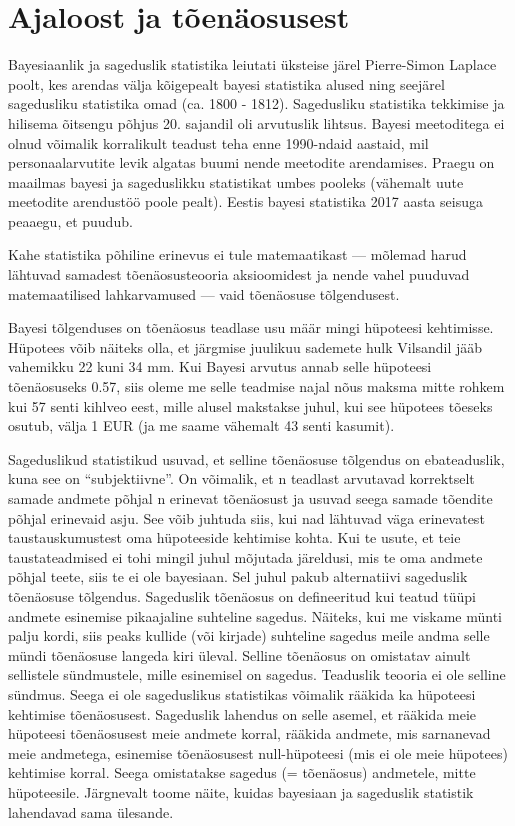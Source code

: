 \documentclass[]{book}
\begin{document}
\section{Ajaloost ja tõenäosusest}\label{ajaloost-ja-toenaosusest}

Bayesiaanlik ja sageduslik statistika leiutati üksteise järel
Pierre-Simon Laplace poolt, kes arendas välja kõigepealt bayesi
statistika alused ning seejärel sagedusliku statistika omad (ca. 1800 -
1812). Sagedusliku statistika tekkimise ja hilisema õitsengu põhjus 20.
sajandil oli arvutuslik lihtsus. Bayesi meetoditega ei olnud võimalik
korralikult teadust teha enne 1990-ndaid aastaid, mil personaalarvutite
levik algatas buumi nende meetodite arendamises. Praegu on maailmas
bayesi ja sageduslikku statistikat umbes pooleks (vähemalt uute
meetodite arendustöö poole pealt). Eestis bayesi statistika 2017 aasta
seisuga peaaegu, et puudub.

Kahe statistika põhiline erinevus ei tule matemaatikast --- mõlemad
harud lähtuvad samadest tõenäosusteooria aksioomidest ja nende vahel
puuduvad matemaatilised lahkarvamused --- vaid tõenäosuse tõlgendusest.

Bayesi tõlgenduses on tõenäosus teadlase usu määr mingi hüpoteesi
kehtimisse. Hüpotees võib näiteks olla, et järgmise juulikuu sademete
hulk Vilsandil jääb vahemikku 22 kuni 34 mm. Kui Bayesi arvutus annab
selle hüpoteesi tõenäosuseks 0.57, siis oleme me selle teadmise najal
nõus maksma mitte rohkem kui 57 senti kihlveo eest, mille alusel
makstakse juhul, kui see hüpotees tõeseks osutub, välja 1 EUR (ja me
saame vähemalt 43 senti kasumit).

Sageduslikud statistikud usuvad, et selline tõenäosuse tõlgendus on
ebateaduslik, kuna see on ``subjektiivne''. On võimalik, et n teadlast
arvutavad korrektselt samade andmete põhjal n erinevat tõenäosust ja
usuvad seega samade tõendite põhjal erinevaid asju. See võib juhtuda
siis, kui nad lähtuvad väga erinevatest taustauskumustest oma
hüpoteeside kehtimise kohta. Kui te usute, et teie taustateadmised ei
tohi mingil juhul mõjutada järeldusi, mis te oma andmete põhjal teete,
siis te ei ole bayesiaan. Sel juhul pakub alternatiivi sageduslik
tõenäosuse tõlgendus. Sageduslik tõenäosus on defineeritud kui teatud
tüüpi andmete esinemise pikaajaline suhteline sagedus. Näiteks, kui me
viskame münti palju kordi, siis peaks kullide (või kirjade) suhteline
sagedus meile andma selle mündi tõenäosuse langeda kiri üleval. Selline
tõenäosus on omistatav ainult sellistele sündmustele, mille esinemisel
on sagedus. Teaduslik teooria ei ole selline sündmus. Seega ei ole
sageduslikus statistikas võimalik rääkida ka hüpoteesi kehtimise
tõenäosusest. Sageduslik lahendus on selle asemel, et rääkida meie
hüpoteesi tõenäosusest meie andmete korral, rääkida andmete, mis
sarnanevad meie andmetega, esinemise tõenäosusest null-hüpoteesi (mis ei
ole meie hüpotees) kehtimise korral. Seega omistatakse sagedus (=
tõenäosus) andmetele, mitte hüpoteesile. Järgnevalt toome näite, kuidas
bayesiaan ja sageduslik statistik lahendavad sama ülesande.
\end{document}
